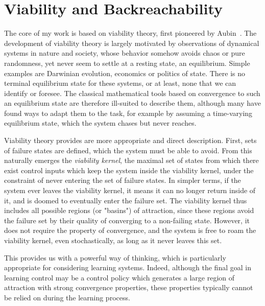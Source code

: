 \section{Viability and Backreachability}

The core of my work is based on viability theory, first pioneered by Aubin~\cite{aubin2011viability}. The development of viability theory is largely motivated by observations of dynamical systems in nature and society, whose behavior somehow avoids chaos or pure randomness, yet never seem to settle at a resting state, an equilibrium.
Simple examples are Darwinian evolution, economics or politics of state. There is no terminal equilibrium state for these systems, or at least, none that we can identify or foresee.
The classical mathematical tools based on convergence to such an equilibrium state are therefore ill-suited to describe them, although many have found ways to adapt them to the task, for example by assuming a time-varying equilibrium state, which the system chases but never reaches. \par
Viability theory provides are more appropriate and direct description. First, sets of failure states are defined, which the system must be able to avoid. From this naturally emerges the \emph{viability kernel}, the maximal set of states from which there exist control inputs which keep the system inside the viability kernel, under the constraint of never entering the set of failure states. In simpler terms, if the system ever leaves the viability kernel, it means it can no longer return inside of it, and is doomed to eventually enter the failure set.
The viability kernel thus includes all possible regions (or "basins") of attraction, since these regions avoid the failure set by their quality of converging to a non-failing state. However, it does not require the property of convergence, and the system is free to roam the viability kernel, even stochastically, as long as it never leaves this set. \par
This provides us with a powerful way of thinking, which is particularly appropriate for considering learning systems. Indeed, although the final goal in learning control may be a control policy which generates a large region of attraction with strong convergence properties, these properties typically cannot be relied on during the learning process. \par
